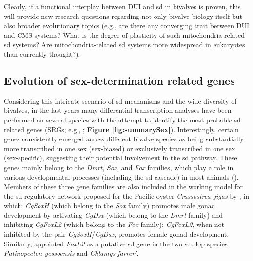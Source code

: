 \documentclass[../main.tex]{subfiles}
\begin{document}
Clearly, if a functional interplay between DUI and \gls{sd} in bivalves is proven, this will provide new research questions regarding not only bivalve biology itself but also broader evolutionary topics (e.g., are there any converging trait between DUI and CMS systems? What is the degree of plasticity of such mitochondria-related \gls{sd} systems? Are mitochondria-related \gls{sd} systems more widespread in eukaryotes than currently thought?).

\subsection{Evolution of sex-determination related genes}
Considering this intricate scenario of \gls{sd} mechanisms and the wide diversity of bivalves, in the last years many differential transcription analyses have been performed on several species with the attempt to identify the most probable \gls{sd} related genes (SRGs; e.g., \textbf{\cite{milani2013nuclear,zhang2014genomic,chen2017transcriptome,capt2018deciphering,shi2018proteome}}; \textbf{Figure \ref{fig:summarySex}}). Interestingly, certain genes consistently emerged across different bivalve species as being substantially more transcribed in one sex (sex-biased) or exclusively transcribed in one sex (sex-specific), suggesting their potential involvement in the \gls{sd} pathway. These genes mainly belong to the \textit{Dmrt}, \textit{Sox}, and \textit{Fox} families, which play a role in various developmental processes (including the \gls{sd} cascade) in most animals (\textbf{\cite{marshall2010homologies,bachtrog2014sex,beukeboom2014evolution}}). Members of these three gene families are also included in the working model for the \gls{sd} regulatory network proposed for the Pacific oyster \textit{Crassostrea gigas} by \textbf{\cite{zhang2014genomic}}, in which: \textit{CgSoxH} (which belong to the \textit{Sox} family) promotes male gonad development by activating \textit{CgDsx} (which belong to the \textit{Dmrt} family) and inhibiting \textit{CgFoxL2} (which belong to the \textit{Fox} family); \textit{CgFoxL2}, when not inhibited by the pair \textit{CgSoxH}/\textit{CgDsx}, promotes female gonad development. Similarly, \textbf{\cite{han2022ancient}} appointed \textit{FoxL2} as a putative \gls{sd} gene in the two scallop species \textit{Patinopecten yessoensis} and \textit{Chlamys farreri}. 
\end{document}
